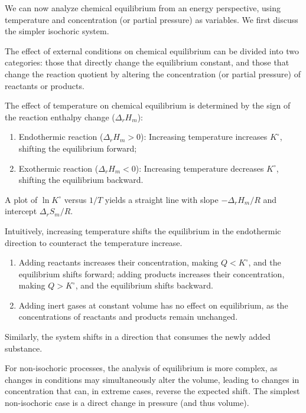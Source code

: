 We can now analyze chemical equilibrium from an energy perspective, using temperature and concentration (or partial pressure) as variables. We first discuss the simpler isochoric system.

The effect of external conditions on chemical equilibrium can be divided into two categories: those that directly change the equilibrium constant, and those that change the reaction quotient by altering the concentration (or partial pressure) of reactants or products.

\begin{proposition}
The effect of temperature on chemical equilibrium is determined by the sign of the reaction enthalpy change ($\Delta_r H_m$):
\begin{enumerate}
    \item Endothermic reaction ($\Delta_r H_m > 0$): Increasing temperature increases $K^\circ$, shifting the equilibrium forward;
    \item Exothermic reaction ($\Delta_r H_m < 0$): Increasing temperature decreases $K^\circ$, shifting the equilibrium backward.
\end{enumerate}
A plot of $\ln K^\circ$ versus $1/T$ yields a straight line with slope $-\Delta_r H_m/R$ and intercept $\Delta_r S_m/R$.
\end{proposition}

Intuitively, increasing temperature shifts the equilibrium in the endothermic direction to counteract the temperature increase.

\begin{proposition}
\begin{enumerate}
    \item Adding reactants increases their concentration, making $Q < K^\circ$, and the equilibrium shifts forward; adding products increases their concentration, making $Q > K^\circ$, and the equilibrium shifts backward.
    \item Adding inert gases at constant volume has no effect on equilibrium, as the concentrations of reactants and products remain unchanged.
\end{enumerate}
\end{proposition}

Similarly, the system shifts in a direction that consumes the newly added substance.

For non-isochoric processes, the analysis of equilibrium is more complex, as changes in conditions may simultaneously alter the volume, leading to changes in concentration that can, in extreme cases, reverse the expected shift. The simplest non-isochoric case is a direct change in pressure (and thus volume).

